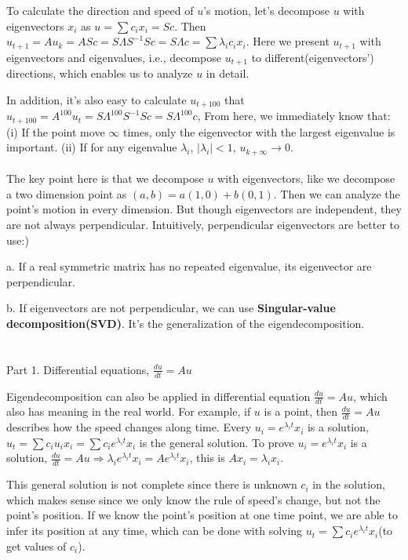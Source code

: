 \documentclass{article}
\begin{document}
\begin{spacing}{1.5}
To calculate the direction and speed of $u$'s motion, let's decompose $u$ with eigenvectors $x_i$ as $u=\sum c_ix_i=Sc$. Then $u_{t+1}=Au_k=ASc=S\Lambda S^{-1}Sc=S\Lambda c=\sum \lambda_i c_i x_i$. Here we present $u_{t+1}$ with eigenvectors and eigenvalues, i.e., decompose $u_{t+1}$ to different(eigenvectors') directions, which enables us to analyze $u$ in detail.

In addition, it's also easy to calculate $u_{t+100}$ that $u_{t+100}=A^{100}u_t=S\Lambda^{100} S^{-1}Sc=S\Lambda^{100}c$, From here, we immediately know that: (i) If the point move $\infty$ times, only the eigenvector with the largest eigenvalue is important. (ii) If for any eigenvalue $\lambda_i$, $|\lambda_i|<1$, $u_{k+\infty}\rightarrow 0$.
\\\\\hspace*{0.5cm}The key point here is that we decompose $u$ with eigenvectors, like we decompose a two dimension point as $(a, b) = a(1, 0) + b(0, 1)$. Then we can analyze the point's motion in every dimension. But though eigenvectors are independent, they are not always perpendicular. Intuitively, perpendicular eigenvectors are better to use:)

a. If a real symmetric matrix has no repeated eigenvalue, its eigenvector are perpendicular.

b. If eigenvectors are not perpendicular, we can use {\bfseries Singular-value decomposition(SVD)}. It's the generalization of the eigendecomposition.


\section{}
Part 1. Differential equations, $\frac{du}{dt}=Au$

Eigendecomposition can also be applied in differential equation $\frac{du}{dt}=Au$, which also has meaning in the real world. For example, if $u$ is a point, then $\frac{du}{dt}=Au$ describes how the speed changes along time. Every $u_i=e^{\lambda_i t}x_i$ is a solution, $u_t=\sum c_i u_i x_i = \sum c_i e^{\lambda_i t} x_i$ is the general solution. To prove $u_i=e^{\lambda_i t}x_i$ is a solution, $\frac{du}{dt}=Au \Rightarrow \lambda_ie^{\lambda_i t} x_i=Ae^{\lambda_i t}x_i$, this is $Ax_i=\lambda_i x_i$.

This general solution is not complete since there is unknown $c_i$ in the solution, which makes sense since we only know the rule of speed's change, but not the point's position. If we know the point's position at one time point, we are able to infer its position at any time, which can be done with solving $u_t=\sum c_i e^{\lambda_i t} x_i$(to get values of $c_i$).


\end{spacing}
\end{document}
